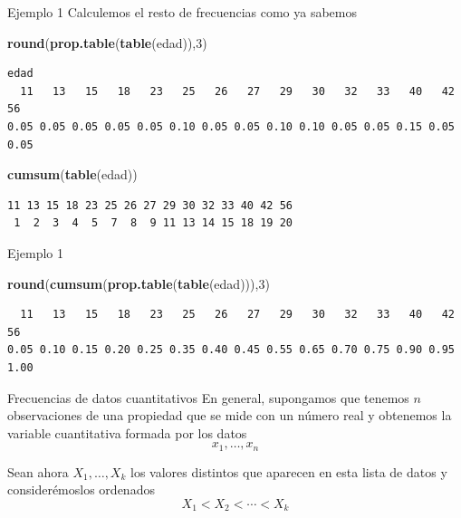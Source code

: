 \documentclass[
  ignorenonframetext,
]{beamer}
\newenvironment{Shaded}{\begin{snugshade}}{\end{snugshade}}
\newcommand{\DecValTok}[1]{\textcolor[rgb]{0.00,0.00,0.81}{#1}}
\newcommand{\FunctionTok}[1]{\textcolor[rgb]{0.13,0.29,0.53}{\textbf{#1}}}
\newcommand{\NormalTok}[1]{#1}
\begin{document}
\begin{frame}[fragile]{Ejemplo 1}
\label{ejemplo-1-9}
Calculemos el resto de frecuencias como ya sabemos

\begin{Shaded}
\begin{Highlighting}[]
\FunctionTok{round}\NormalTok{(}\FunctionTok{prop.table}\NormalTok{(}\FunctionTok{table}\NormalTok{(edad)),}\DecValTok{3}\NormalTok{)}
\end{Highlighting}
\end{Shaded}

\begin{verbatim}
edad
  11   13   15   18   23   25   26   27   29   30   32   33   40   42   56 
0.05 0.05 0.05 0.05 0.05 0.10 0.05 0.05 0.10 0.10 0.05 0.05 0.15 0.05 0.05 
\end{verbatim}

\begin{Shaded}
\begin{Highlighting}[]
\FunctionTok{cumsum}\NormalTok{(}\FunctionTok{table}\NormalTok{(edad))}
\end{Highlighting}
\end{Shaded}

\begin{verbatim}
11 13 15 18 23 25 26 27 29 30 32 33 40 42 56 
 1  2  3  4  5  7  8  9 11 13 14 15 18 19 20 
\end{verbatim}
\end{frame}

\begin{frame}[fragile]{Ejemplo 1}
\label{ejemplo-1-10}
\begin{Shaded}
\begin{Highlighting}[]
\FunctionTok{round}\NormalTok{(}\FunctionTok{cumsum}\NormalTok{(}\FunctionTok{prop.table}\NormalTok{(}\FunctionTok{table}\NormalTok{(edad))),}\DecValTok{3}\NormalTok{)}
\end{Highlighting}
\end{Shaded}

\begin{verbatim}
  11   13   15   18   23   25   26   27   29   30   32   33   40   42   56 
0.05 0.10 0.15 0.20 0.25 0.35 0.40 0.45 0.55 0.65 0.70 0.75 0.90 0.95 1.00 
\end{verbatim}
\end{frame}

\begin{frame}{Frecuencias de datos cuantitativos}
\label{frecuencias-de-datos-cuantitativos-1}
En general, supongamos que tenemos \(n\) observaciones de una propiedad
que se mide con un número real y obtenemos la variable cuantitativa
formada por los datos \[x_1,\dots, x_n\]

Sean ahora \(X_1,\dots,X_k\) los valores distintos que aparecen en esta
lista de datos y considerémoslos ordenados \[X_1<X_2<\cdots<X_k\]
\end{frame}
\end{document}
